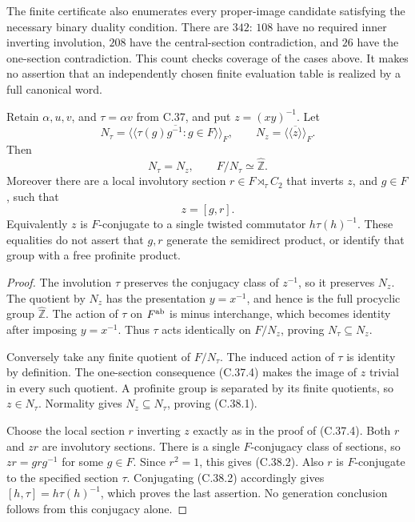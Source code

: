 The finite certificate also enumerates every proper-image
candidate satisfying the necessary binary duality condition.
There are \(342\): \(108\) have no required inner inverting
involution, \(208\) have the central-section contradiction,
and \(26\) have the one-section contradiction. This count
checks coverage of the cases above. It makes no assertion that
an independently chosen finite evaluation table is realized by
a full canonical word.

Retain \(\alpha,u,v\), and \(\tau=\alpha v\) from C.37, and put
\(z=(xy)^{-1}\). Let
\[
 N_\tau=\overline{\langle\!\langle
          \tau(g)g^{-1}:g\in F\rangle\!\rangle}_F,
 \qquad
 N_z=\overline{\langle\!\langle z\rangle\!\rangle}_F .
\]
Then
\[
             N_\tau=N_z,\qquad F/N_\tau\simeq\widehat{\mathbb Z}.
 \tag{C.38.1}
\]
Moreover there are a local involutory section
\(r\in F\rtimes_\tau C_2\) that inverts \(z\), and \(g\in F\),
such that
\[
                              z=[g,r].
 \tag{C.38.2}
\]
Equivalently \(z\) is \(F\)-conjugate to a single twisted
commutator \(h\tau(h)^{-1}\). These equalities do not assert
that \(g,r\) generate the semidirect product, or identify that
group with a free profinite product.

\begin{proof}
The involution \(\tau\) preserves the conjugacy class of
\(z^{-1}\), so it preserves \(N_z\). The quotient by \(N_z\)
has the presentation \(y=x^{-1}\), and hence is the full
procyclic group \(\widehat{\mathbb Z}\). The action of
\(\tau\) on \(F^{\rm ab}\) is minus interchange, which becomes
identity after imposing \(y=x^{-1}\). Thus \(\tau\) acts
identically on \(F/N_z\), proving \(N_\tau\subseteq N_z\).

Conversely take any finite quotient of \(F/N_\tau\).
The induced action of \(\tau\) is identity by definition.
The one-section consequence (C.37.4) makes the image of
\(z\) trivial in every such quotient. A profinite group is
separated by its finite quotients, so \(z\in N_\tau\).
Normality gives \(N_z\subseteq N_\tau\), proving (C.38.1).

Choose the local section \(r\) inverting \(z\) exactly as
in the proof of (C.37.4). Both \(r\) and \(zr\) are
involutory sections. There is a single \(F\)-conjugacy class
of sections, so \(zr=grg^{-1}\) for some \(g\in F\).
Since \(r^2=1\), this gives (C.38.2). Also \(r\) is
\(F\)-conjugate to the specified section \(\tau\).
Conjugating (C.38.2) accordingly gives
\([h,\tau]=h\tau(h)^{-1}\), which proves the last assertion.
No generation conclusion follows from this conjugacy alone.
\end{proof}



